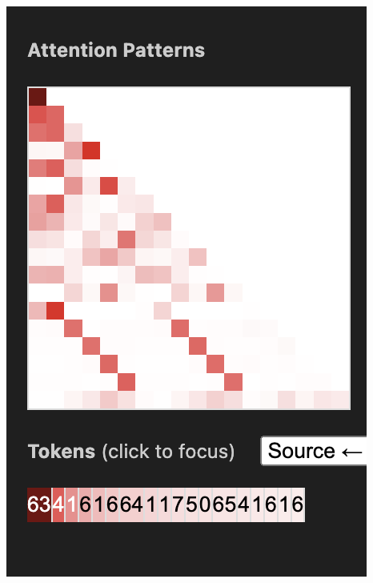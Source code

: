 \documentclass{article}
\begin{document}
\begin{center}
    \includegraphics[scale=0.4]{images/att_encoding_1hd2.png}

\end{center}
\end{document}
